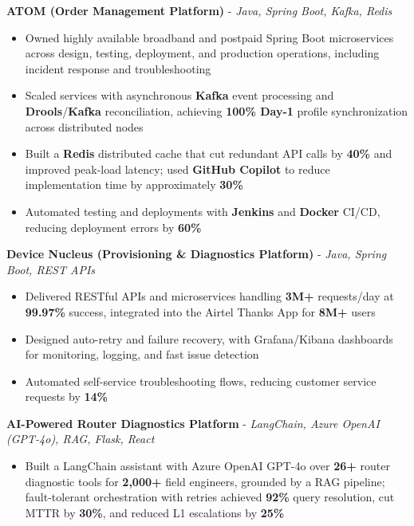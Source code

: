 \documentclass[letterpaper,10pt]{article}
\newcommand{\resumeItem}[1]{
  \item\small{{#1 \vspace{-2pt}}}
}
\newcommand{\resumeItemListStart}{\begin{itemize}[itemsep=0pt,topsep=2pt,parsep=0pt]}
\newcommand{\resumeItemListEnd}{\end{itemize}\vspace{-5pt}}
\begin{document}
      \vspace{4pt}
      \textbf{\small ATOM (Order Management Platform)} - \textit{\small Java, Spring Boot, Kafka, Redis} \\
      \vspace{-2pt}
      \resumeItemListStart
        \resumeItem{Owned highly available broadband and postpaid Spring Boot microservices across design, testing, deployment, and production operations, including incident response and troubleshooting}
        \resumeItem{Scaled services with asynchronous \textbf{Kafka} event processing and \textbf{Drools}/\textbf{Kafka} reconciliation, achieving \textbf{100\% Day-1} profile synchronization across distributed nodes}
        \resumeItem{Built a \textbf{Redis} distributed cache that cut redundant API calls by \textbf{40\%} and improved peak-load latency; used \textbf{GitHub Copilot} to reduce implementation time by approximately \textbf{30\%}}
        \resumeItem{Automated testing and deployments with \textbf{Jenkins} and \textbf{Docker} CI/CD, reducing deployment errors by \textbf{60\%}}
      \resumeItemListEnd

      \vspace{2pt}
      \textbf{\small Device Nucleus (Provisioning \& Diagnostics Platform)} - \textit{\small Java, Spring Boot, REST APIs} \\
      \vspace{-2pt}
      \resumeItemListStart
        \resumeItem{Delivered RESTful APIs and microservices handling \textbf{3M+} requests/day at \textbf{99.97\%} success, integrated into the Airtel Thanks App for \textbf{8M+} users}
        \resumeItem{Designed auto-retry and failure recovery, with Grafana/Kibana dashboards for monitoring, logging, and fast issue detection}
        \resumeItem{Automated self-service troubleshooting flows, reducing customer service requests by \textbf{14\%}}
      \resumeItemListEnd

      \vspace{2pt}
      \textbf{\small AI-Powered Router Diagnostics Platform} - \textit{\small LangChain, Azure OpenAI (GPT-4o), RAG, Flask, React} \\
      \vspace{-2pt}
      \resumeItemListStart
        \resumeItem{Built a LangChain assistant with Azure OpenAI GPT-4o over \textbf{26+} router diagnostic tools for \textbf{2,000+} field engineers, grounded by a RAG pipeline; fault-tolerant orchestration with retries achieved \textbf{92\%} query resolution, cut MTTR by \textbf{30\%}, and reduced L1 escalations by \textbf{25\%}}
      \resumeItemListEnd
\end{document}

